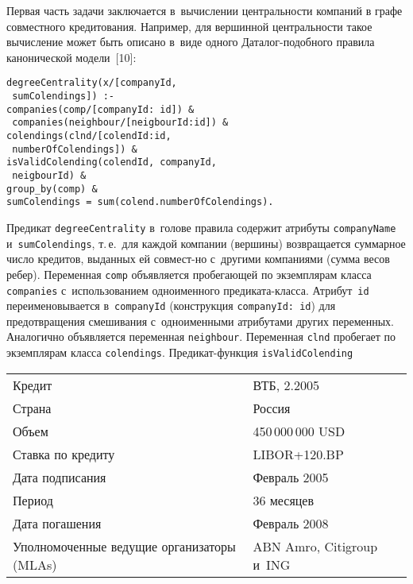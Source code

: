 \begin{multicols}{2}
\vspace*{-2pt}

      Первая часть задачи заключается в~вычислении центральности компаний 
в графе совместного кредитования. Например, для вершинной центральности 
такое вычисление может быть описано в~виде одного Да\-та\-лог-по\-доб\-но\-го 
правила канонической модели~[10]:

\vspace*{-2pt}

\noindent
      {\small
      \begin{verbatim}
degreeCentrality(x/[companyId, 
 sumColendings]) :-
companies(comp/[companyId: id]) & 
 companies(neighbour/[neigbourId:id]) &
colendings(clnd/[colendId:id, 
 numberOfColendings]) &
isValidColending(colendId, companyId, 
 neigbourId) &
group_by(comp) &
sumColendings = sum(colend.numberOfColendings).
\end{verbatim}
}

\vspace*{-2pt}

      Предикат \verb"degreeCentrality" в~голове правила содержит атрибуты 
\verb"companyName" и~\verb"sumColendings", т.\,е.\ для каждой компании 
(вершины) возвращается суммарное число кредитов, выданных ей совмест-\linebreak но 
с~другими компаниями (сумма весов ребер). Перемен\-ная \verb"comp" 
объявляется пробегающей по экземплярам класса \verb"companies" 
с~использованием одноименного пре\-ди\-ка\-та-клас\-са. Атрибут~\verb"id" 
переименовывается в~\verb"companyId" (конструкция \verb"companyId: id") для 
предотвращения смешивания с~одноименными атрибутами других переменных. 
Аналогично объявляется переменная \verb"neighbour". Переменная \verb"clnd" 
пробегает по экземплярам класса \verb"colendings". Пре\-ди\-кат-функция 
\verb"isValidColending"\linebreak\vspace*{-12pt}

\begin{table*}[b]\small
\begin{center}
\vspace*{2ex}

\begin{tabular}{|l|l|}
\hline
 Кредит&ВТБ, 2.2005\\
 Страна&Россия\\
 Объем&450\,000\,000 USD\\
 Ставка по кредиту&LIBOR\;+\;120.BP\\
 Дата подписания&Февраль 2005\\
 Период&36 месяцев\\
 Дата погашения&Февраль 2008\\
 Уполномоченные ведущие организаторы (MLAs)&ABN Amro, Citigroup и~ING\\
 \hline
 \end{tabular}
 \end{center}
 \end{table*}


\end{multicols}
